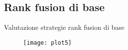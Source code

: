 \subsection{Rank fusion di base}
\begin{frame}{Valutazione strategie rank fusion di base}
	\begin{figure}
	\texttt{[image: plot5]}
	\end{figure}
	
\end{frame}